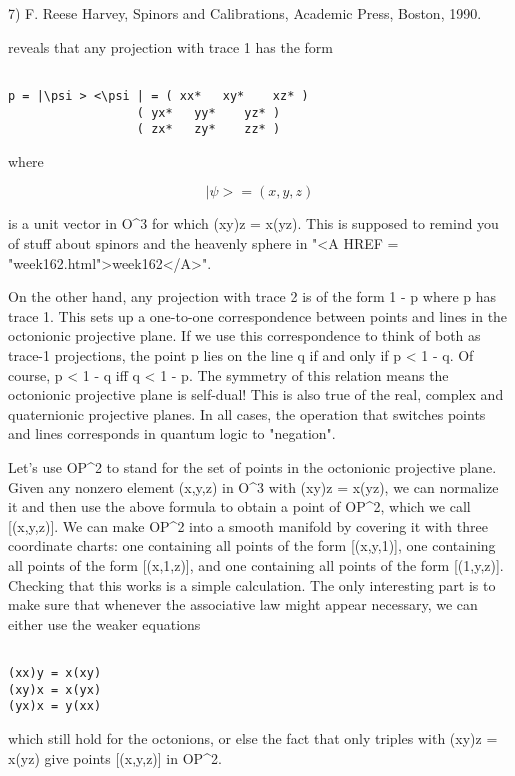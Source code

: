 7) F. Reese Harvey, Spinors and Calibrations, Academic Press, Boston, 1990.

reveals that any projection with trace 1 has the form


\begin{verbatim}

p = |\psi > <\psi | = ( xx*   xy*    xz* )
                  ( yx*   yy*    yz* )
                  ( zx*   zy*    zz* )
\end{verbatim}
    
where 


$$

|\psi > = (x,y,z) 
$$
    
is a unit vector in O^{3} for which (xy)z = x(yz).  This is
supposed to remind you of stuff about spinors and the heavenly sphere in
"<A HREF = "week162.html">week162</A>".

On the other hand, any projection with trace 2 is of the form 1 - p
where p has trace 1.  This sets up a one-to-one correspondence between
points and lines in the octonionic projective plane.  If we use this
correspondence to think of both as trace-1 projections, the point p
lies on the line q if and only if p < 1 - q.  Of course, p < 1 - q
iff q < 1 - p.   The symmetry of this relation means the octonionic
projective plane is self-dual!  This is also true of the real, complex
and quaternionic projective planes.  In all cases, the operation that
switches points and lines corresponds in quantum logic to "negation".

Let's use OP^{2} to stand for the set of points in the
octonionic projective plane.  Given any nonzero element (x,y,z) in
O^{3} with (xy)z = x(yz), we can normalize it and then use the
above formula to obtain a point of OP^{2}, which we call
[(x,y,z)].  We can make OP^{2} into a smooth manifold by
covering it with three coordinate charts: one containing all points of
the form [(x,y,1)], one containing all points of the form [(x,1,z)], and
one containing all points of the form [(1,y,z)].  Checking that this
works is a simple calculation.  The only interesting part is to make
sure that whenever the associative law might appear necessary, we can
either use the weaker equations


\begin{verbatim}

(xx)y = x(xy) 
(xy)x = x(yx)
(yx)x = y(xx)
\end{verbatim}
    
which still hold for the octonions, or else the fact that only triples
with (xy)z = x(yz) give points [(x,y,z)] in OP^{2}.  

